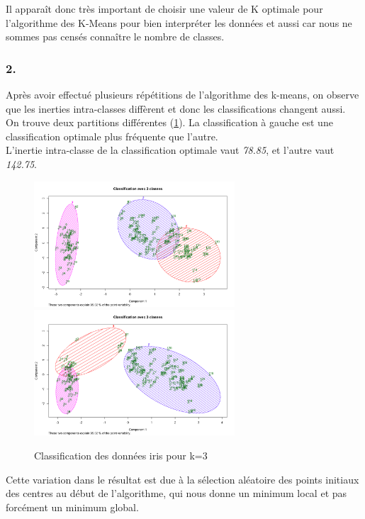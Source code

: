 \documentclass{article}
\begin{document}
Il apparaît donc très important de choisir une valeur de K optimale pour l'algorithme des K-Means pour bien interpréter les données et aussi car nous ne sommes pas censés connaître le nombre de classes.


\subsubsection*{2.}
Après avoir effectué plusieurs répétitions de l'algorithme des k-means, on observe que les inerties intra-classes diffèrent et donc les classifications changent aussi.\\



On trouve deux partitions différentes (\ref{iris_kmeans_pour_k_3}). La classification à gauche est une classification optimale plus fréquente que l'autre.\\
L'inertie intra-classe de la classification optimale vaut \textit{78.85}, et l'autre vaut \textit{142.75}.

\begin{figure}[H]
\centering
\includegraphics[width=7.5cm]{./img/iris_kmeans_3.png}
\includegraphics[width=7.5cm]{./img/iris_kmeans_3_2.png}
\caption{Classification des données iris pour k=3}
\label{iris_kmeans_pour_k_3}
\end{figure}

Cette variation dans le résultat est due à la sélection aléatoire des points initiaux des centres au début de l'algorithme, qui nous donne un minimum local et pas forcément un minimum global.
\end{document}
